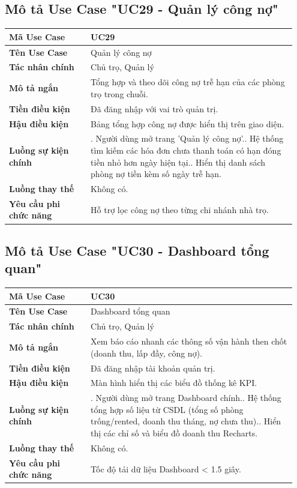 \documentclass[a4paper,oneside]{report}
\begin{document}
\subsection{Mô tả Use Case "UC29 - Quản lý công nợ"}

\begin{longtable}[]{@{}>{\RaggedRight\arraybackslash}p{0.27\linewidth}>{\RaggedRight\arraybackslash}p{0.68\linewidth}@{}}
\toprule
\textbf{Mã Use Case} & UC29\tabularnewline
\midrule
\endhead
\textbf{Tên Use Case} & Quản lý công nợ\tabularnewline
\textbf{Tác nhân chính} & Chủ trọ, Quản lý\tabularnewline
\textbf{Mô tả ngắn} & Tổng hợp và theo dõi công nợ trễ hạn của các phòng
trọ trong chuỗi.\tabularnewline
\textbf{Tiền điều kiện} & Đã đăng nhập với vai trò quản
trị.\tabularnewline
\textbf{Hậu điều kiện} & Bảng tổng hợp công nợ được hiển thị trên giao
diện.\tabularnewline
\textbf{Luồng sự kiện chính} & 1. Người dùng mở trang
'Quản lý công nợ'.\newline 2. Hệ thống tìm kiếm các hóa đơn chưa
thanh toán có hạn đóng tiền nhỏ hơn ngày hiện tại.\newline 3. Hiển
thị danh sách phòng nợ tiền kèm số ngày trễ hạn.\tabularnewline
\textbf{Luồng thay thế} & Không có.\tabularnewline
\textbf{Yêu cầu phi chức năng} & Hỗ trợ lọc công nợ theo từng chi nhánh
nhà trọ.\tabularnewline
\bottomrule
\end{longtable}

\subsection{Mô tả Use Case "UC30 - Dashboard tổng quan"}

\begin{longtable}[]{@{}>{\RaggedRight\arraybackslash}p{0.27\linewidth}>{\RaggedRight\arraybackslash}p{0.68\linewidth}@{}}
\toprule
\textbf{Mã Use Case} & UC30\tabularnewline
\midrule
\endhead
\textbf{Tên Use Case} & Dashboard tổng quan\tabularnewline
\textbf{Tác nhân chính} & Chủ trọ, Quản lý\tabularnewline
\textbf{Mô tả ngắn} & Xem báo cáo nhanh các thông số vận hành then chốt
(doanh thu, lấp đầy, công nợ).\tabularnewline
\textbf{Tiền điều kiện} & Đã đăng nhập tài khoản quản
trị.\tabularnewline
\textbf{Hậu điều kiện} & Màn hình hiển thị các biểu đồ thống kê
KPI.\tabularnewline
\textbf{Luồng sự kiện chính} & 1. Người dùng mở trang
Dashboard chính.\newline 2. Hệ thống tổng hợp số liệu từ CSDL (tổng
số phòng trống/rented, doanh thu tháng, nợ chưa thu).\newline 3.
Hiển thị các chỉ số và biểu đồ doanh thu Recharts.\tabularnewline
\textbf{Luồng thay thế} & Không có.\tabularnewline
\textbf{Yêu cầu phi chức năng} & Tốc độ tải dữ liệu Dashboard
\textless{} 1.5 giây.\tabularnewline
\bottomrule
\end{longtable}
\end{document}
